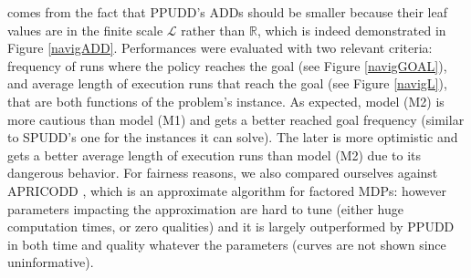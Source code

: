 comes from the fact that PPUDD's ADDs should be smaller because their leaf
values are in the finite scale $\mathcal{L}$ rather than $\mathbb{R}$, which is indeed
demonstrated in Figure \ref{navigADD}. Performances were evaluated 
with two relevant criteria: frequency of runs where 
the policy reaches the goal (see Figure \ref{navigGOAL}), and
average length of execution runs that reach the goal (see Figure \ref{navigL}), 
that are both functions of the problem's instance.
As expected, model (M2) is more cautious than model (M1) and gets a better 
reached goal frequency  (similar to SPUDD's one for the instances it can solve). 
The later is more optimistic and gets a better average length of execution runs than model (M2) due to
its dangerous behavior. For fairness reasons, we also compared ourselves against 
APRICODD \cite{St-aubin00apricodd:approximate}, 
which is an approximate algorithm for factored MDPs: however parameters impacting the approximation
are hard to tune (either huge computation times, or zero qualities) and it is
largely outperformed by PPUDD in both time and quality whatever the parameters %
(curves are not shown since uninformative).\\

